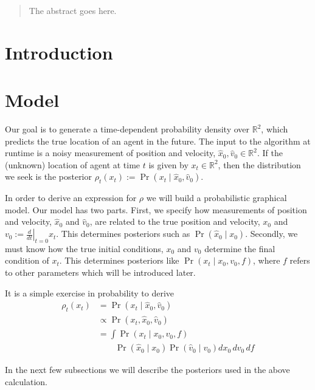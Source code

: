 \documentclass[conference]{IEEEtran}
\begin{document}
\begin{abstract}
The abstract goes here.
\end{abstract}

\IEEEpeerreviewmaketitle

\section{Introduction}

\section{Model}
Our goal is to generate a time-dependent probability density over $\mathbb{R}^2$, which predicts the true location of an agent in the future.
The input to the algorithm at runtime is a noisy measurement of position and velocity, $\hat{x}_0, \hat{v}_0 \in \mathbb{R}^2$.
If the (unknown) location of agent at time $t$ is given by $x_t \in \mathbb{R}^2$, then the distribution we seek is the posterior $\rho_t(x_t) := \Pr( x_t \mid \hat{x}_0, \hat{v}_0 )$.

In order to derive an expression for $\rho$ we will build a probabilistic graphical model.
Our model has two parts.
First, we specify how measurements of position and velocity, $\hat{x}_0$ and $\hat{v}_0$, are related to the true position and velocity, $x_0$ and $v_0 := \left. \frac{d}{dt} \right|_{t=0} x_t$.
This determines posteriors such as $\Pr(\hat{x}_0 \mid x_0)$.
Secondly, we must know how the true initial conditions, $x_0$ and $v_0$ determine the final condition of $x_t$.
This determines posteriors like $\Pr(x_t \mid x_0, v_0, f )$, where $f$ refers to other parameters which will be introduced later.

It is a simple exercise in probability to derive
\begin{align*}
	\rho_t(x_t) &= \Pr( x_t \mid \hat{x}_0, \hat{v}_0 ) \\
	&\propto \Pr( x_t, \hat{x}_0, \hat{v}_0 ) \\
	&= \int \Pr( x_t \mid  x_0, v_0, f ) \\
	 &\qquad \Pr( \hat{x}_0  \mid x_0 ) \Pr( \hat{v}_0 \mid v_0 ) dx_0 \, dv_0 \, df
\end{align*}

In the next few subsections we will describe the posteriors used in the above calculation.
\end{document}
